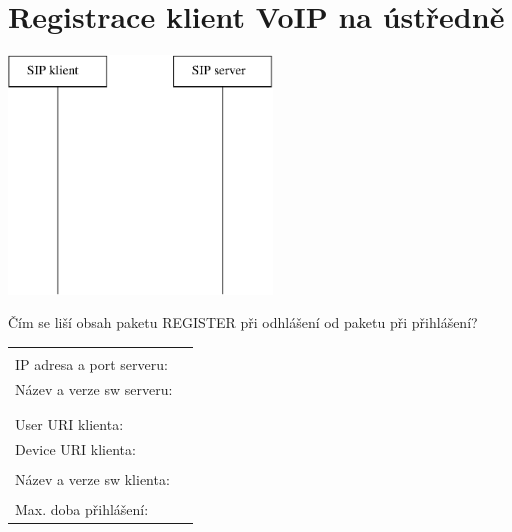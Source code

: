 \section{Registrace klient VoIP na ústředně}
\begin{multicols}{2}
  \begin{center}
    \includegraphics[width=70mm]{registrace.eps}
  \end{center}
    Čím se liší obsah paketu REGISTER při odhlášení od paketu při přihlášení?
  \columnbreak
  
  \begin{tabular}{lp{2cm}}
    &\\
    IP adresa a port serveru: &\\
    Název a verze sw serveru: &\\
    &\\
    &\\
    User URI klienta: &\\
    Device URI klienta: &\\
    &\\
    Název a verze sw klienta: &\\
    &\\
    Max. doba přihlášení: &\\
  \end{tabular}               
\end{multicols}

